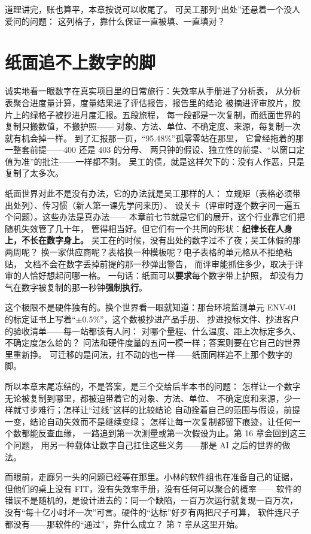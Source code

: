 道理讲完，账也算平，本章按说可以收尾了。
可吴工那列“出处”还悬着一个没人爱问的问题：
这列格子，靠什么保证一直被填、一直填对？

\section{纸面追不上数字的脚}

诚实地看一眼数字在真实项目里的日常旅行：失效率从手册进了分析表，
从分析表聚合进度量计算，度量结果进了评估报告，报告里的结论
被摘进评审胶片，胶片上的绿格子被抄进月度汇报。五段旅程，
每一段都是一次复制，而纸面世界的复制只搬数值，不搬护照——
对象、方法、单位、不确定度、来源，每复制一次就有机会掉一样。
到了汇报那一页，“95.48\%”孤零零站在那里，
它曾经拖着的那一整套前提——400 还是 403 的分母、
两只钟的假设、独立性的前提、“以窗口定值为准”的批注——一样都不剩。
吴工的债，就是这样欠下的：没有人作恶，只是复制了太多次。

纸面世界对此不是没有办法，它的办法就是吴工那样的人：
立规矩（表格必须带出处列）、传习惯（新人第一课先学问来历）、
设关卡（评审时逐个数字问一遍五个问题）。这些办法是真办法——
本章前七节就是它们的展开，这个行业靠它们把随机失效管了几十年，
管得相当好。但它们有一个共同的形状：\textbf{纪律长在人身上，不长在数字身上。}
吴工在的时候，没有出处的数字过不了夜；吴工休假的那两周呢？
换一家供应商呢？表格换一种模板呢？电子表格的单元格从不拒绝粘贴，
文档不会在数字丢掉前提的那一秒弹出警告，
而评审能抓住多少，取决于评审的人恰好想起问哪一格。
一句话：纸面可以\textbf{要求}每个数字带上护照，
却没有力气在数字被复制的那一秒钟\textbf{强制执行}。

这个极限不是硬件独有的。换个世界看一眼就知道：那台环境监测单元
ENV-01 的标定证书上写着“\(\pm\)0.5\%”，这个数被抄进产品手册、
抄进投标文件、抄进客户的验收清单——每一站都该有人问：
对哪个量程、什么温度、距上次标定多久、不确定度怎么给的？
问法和硬件度量的五问一模一样；答案则要在它自己的世界里重新挣。
可迁移的是问法，扛不动的也一样——纸面同样追不上那个数字的脚。

所以本章末尾冻结的，不是答案，是三个交给后半本书的问题：
怎样让一个数字无论被复制到哪里，都被迫带着它的对象、方法、单位、
不确定度和来源，少一样就寸步难行；怎样让“过线”这样的比较结论
自动拴着自己的范围与假设，前提一变，结论自动失效而不是继续变绿；
怎样让每一次复制都留下痕迹，让任何一个数都能反查血缘，
一路追到第一次测量或第一次假设为止。第 16 章会回到这三个问题，
用另一种载体让数字自己扛住这些义务——那是 AI 之后的世界的做法。

而眼前，走廊另一头的问题已经等在那里。小林的软件组也在准备自己的证据，
但他们的桌上没有 FIT，没有失效率手册，没有任何可以聚合的概率——
软件的错误不是随机的，是设计进去的：同一个缺陷，一百万次运行就复现一百万次，
没有“每十亿小时坏一次”可言。硬件的“达标”好歹有两把尺子可算，
软件连尺子都没有——那软件的“通过”，靠什么成立？
第 7 章从这里开始。

